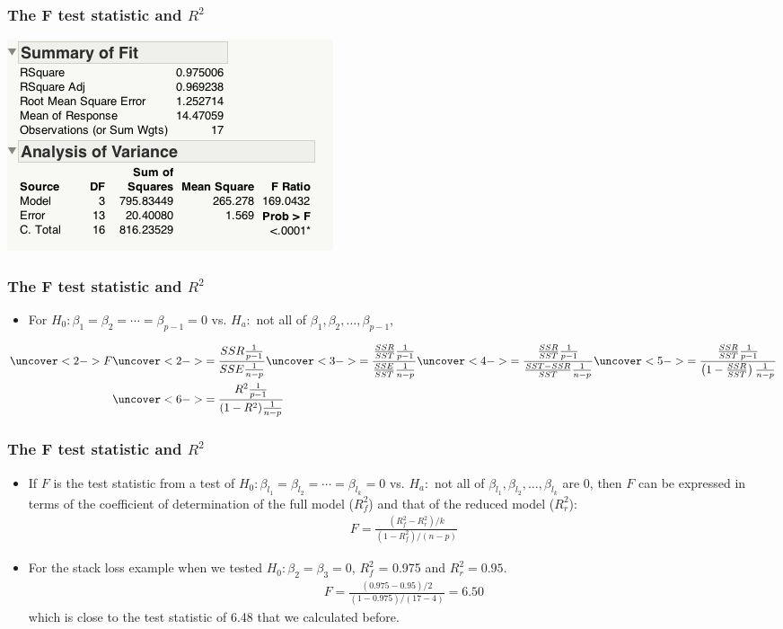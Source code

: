 \documentclass[handout]{beamer}\usepackage[]{graphicx}\usepackage[]{color}
\numberwithin{equation}{section}
\begin{document}
\begin{frame}
\frametitle{The F test statistic and $R^2$}
\begin{center}
 \includegraphics{../../fig/rsqf1.png}
\end{center}
\end{frame}

\begin{frame}
\frametitle{The F test statistic and $R^2$}
\begin{itemize}
\item For $H_0: \beta_1 = \beta_2 = \cdots = \beta_{p - 1} = 0$ vs. $H_a:$ not all of $\beta_1, \beta_2, \ldots, \beta_{p-1}$,
\end{itemize}
\begin{align*}
\uncover<2->{F} & \uncover<2->{= \frac{SSR \frac{1}{p-1}}{SSE\frac{1}{n-p}}} \uncover<3->{ = \frac{\frac{SSR}{SST} \frac{1}{p-1}}{\frac{SSE}{SST}\frac{1}{n-p}}} \uncover<4->{ = \frac{\frac{SSR}{SST} \frac{1}{p-1}}{\frac{SST - SSR}{SST}\frac{1}{n-p}}} \uncover<5->{ = \frac{\frac{SSR}{SST} \frac{1}{p-1}}{\left ( 1 - \frac{SSR}{SST} \right ) \frac{1}{n-p}}} \\
&\uncover<6->{= \frac{R^2 \frac{1}{p-1}}{(1- R^2) \frac{1}{n-p}}}
\end{align*}
\end{frame}

\begin{frame}
\frametitle{The F test statistic and $R^2$}
\begin{itemize}
\item If $F$ is the test statistic from a test of $H_0: \beta_{l_1} = \beta_{l_2} = \cdots = \beta_{l_k} = 0$ vs. $H_a:$ not all of $\beta_{l_1}, \beta_{l_2}, \ldots, \beta_{l_k}$ are 0, then $F$ can be expressed in terms of the coefficient of determination of the full model ($R^2_f$) and that of the reduced model ($R^2_r$):
\pause \begin{align*}
F = \frac{(R^2_f - R^2_r)/k}{(1-R_f^2)/(n - p)}
\end{align*}
\pause \item For the stack loss example when we tested $H_0: \beta_2 = \beta_3 = 0$, $R_f^2$ = 0.975 and $R^2_r = 0.95$.
\pause \begin{align*}
F = \frac{(0.975  - 0.95)/ 2}{(1-0.975)/(17-4)} = 6.50
\end{align*}
which is close to the test statistic of 6.48 that we calculated before.
\end{itemize}
\end{frame}
\end{document}
